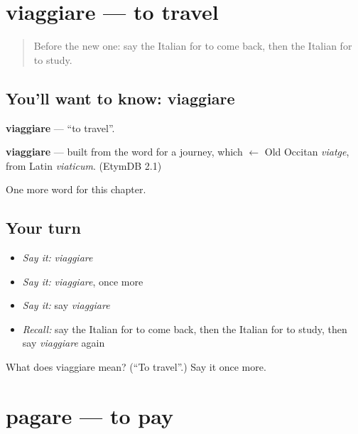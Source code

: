 \section[viaggiare]{viaggiare — to travel}

\label{lesson:IT-C60-viaggiare}



\begin{quote}
Before the new one: say the Italian for to come back, then the Italian for to study.
\end{quote}

\subsection*{You'll want to know: viaggiare}
\textbf{viaggiare} — \textquotedblleft{}to travel\textquotedblright{}.

\begin{cousinweb}
\textbf{viaggiare} — built from the word for a journey, which $\leftarrow$ Old Occitan \emph{viatge}, from Latin \emph{viaticum}. (EtymDB 2.1)
\end{cousinweb}

\begin{grammarlens}[title={What you've built}]
One more word for this chapter.
\end{grammarlens}

\subsection*{Your turn}
\begin{itemize}
\raggedright
  \item \emph{Say it:} \emph{viaggiare}
  \item \emph{Say it:} \emph{viaggiare}, once more
  \item \emph{Say it:} say \emph{viaggiare}
  \item \emph{Recall:} say the Italian for to come back, then the Italian for to study, then say \emph{viaggiare} again
\end{itemize}

\begin{tcolorbox}[breakable,colback=teal!4,colframe=teal!35!black,title={Before you move on}]
What does viaggiare mean? (\textquotedblleft{}To travel\textquotedblright{}.) Say it once more.
\end{tcolorbox}
\section[pagare]{pagare — to pay}


